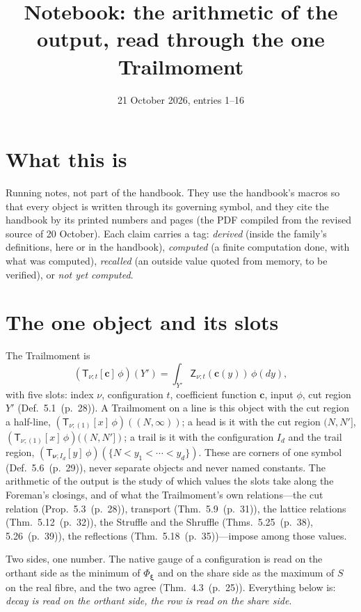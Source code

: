 \documentclass[11pt]{article}
\title{Notebook: the arithmetic of the output, read through the one Trailmoment}
\date{21 October 2026, entries 1--16}
\author{}
\newcommand{\sZ}{\mathsf Z}
\newcommand{\sT}{\mathsf T}
\newcommand{\Tx}[3]{(\sT_{#1;(1)}[x]\,#2)((#3,\infty))}
\newcommand{\Th}[4]{(\sT_{#1;(1)}[x]\,#2)((#3,#4])}
\newcommand{\Ttr}[4]{(\sT_{#1;I_{#2}}[y]\,#3)(\{#4<y_1<\cdots<y_{#2}\})}
\newcommand{\hb}[2]{#1~(p.~#2)}   %
\theoremstyle{plain}
\theoremstyle{remark}
\begin{document}
\maketitle

\section*{What this is}

Running notes, not part of the handbook. They use the handbook's macros so that every object is written through its governing symbol, and they cite the handbook by its printed numbers and pages (the PDF compiled from the revised source of 20 October). Each claim carries a tag: \textit{derived} (inside the family's definitions, here or in the handbook), \textit{computed} (a finite computation done, with what was computed), \textit{recalled} (an outside value quoted from memory, to be verified), or \textit{not yet computed}.

\section{The one object and its slots}

The Trailmoment is
\[
(\sT_{\nu;t}[\mathbf c]\,\phi)(Y')=\int_{Y'}\sZ_{\nu;t}(\mathbf c(y))\,\phi(dy),
\]
with five slots: index $\nu$, configuration $t$, coefficient function $\mathbf c$, input $\phi$, cut region $Y'$ (Def.~\hb{5.1}{28}). A Trailmoment on a line is this object with the cut region a half-line, $\Tx{\nu}{\phi}{N}$; a head is it with the cut region $(N,N']$, $\Th{\nu}{\phi}{N}{N'}$; a trail is it with the configuration $I_d$ and the trail region, $\Ttr{\boldsymbol\nu}{d}{\phi}{N}$. These are corners of one symbol (Def.~\hb{5.6}{29}), never separate objects and never named constants. The arithmetic of the output is the study of which values the slots take along the Foreman's closings, and of what the Trailmoment's own relations---the cut relation (Prop.~\hb{5.3}{28}), transport (Thm.~\hb{5.9}{31}), the lattice relations (Thm.~\hb{5.12}{32}), the Struffle and the Shruffle (Thms.~\hb{5.25}{38}, \hb{5.26}{39}), the reflections (Thm.~\hb{5.18}{35})---impose among those values.

Two sides, one number. The native gauge of a configuration is read on the orthant side as the minimum of $\Phi_{\boldsymbol\xi}$ and on the share side as the maximum of $S$ on the real fibre, and the two agree (Thm.~\hb{4.3}{25}). Everything below is: \emph{decay is read on the orthant side, the row is read on the share side}.
\end{document}

